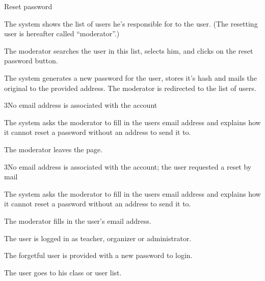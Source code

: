 
\begin{uc}{Reset password}

    \begin{uc-mss}
    \item The system shows the list of users he's responsible for to the user.
        (The resetting user is hereafter called ``moderator''.)
    \item The moderator searches the user in this list, selects him, and clicks
        on the reset password button. 
    \item The system generates a new password for the user, stores it's hash and
        mails the original to the provided address. The moderator is redirected
        to the list of users.
    \end{uc-mss}

    \begin{uc-ext}

        \begin{uc-fail}{3}{No email address is associated with the account}
        \item The system asks the moderator to fill in the users email address
            and explains how it cannot reset a password without an address to
            send it to.
        \item The moderator leaves the page.
        \end{uc-fail}

        \begin{uc-fail}{3}{No email address is associated with the account; the
            user requested a reset by mail}
        \item The system asks the moderator to fill in the users email address
            and explains how it cannot reset a password without an address to
            send it to.
        \item The moderator fills in the user's email address.
        \end{uc-fail}

    \end{uc-ext}

    \begin{uc-pre}
    \item The user is logged in as teacher, organizer or administrator.
    \end{uc-pre}

    \begin{uc-post}
    \item The forgetful user is provided with a new password to login.
    \end{uc-post}

    \begin{uc-trig}
        The user goes to his class or user list.
    \end{uc-trig}

\end{uc}

